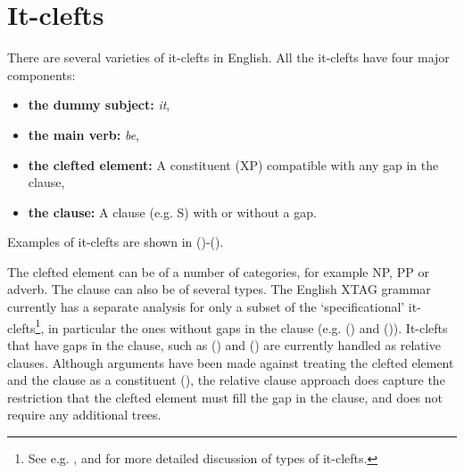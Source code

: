 \chapter{It-clefts}
\label{it-clefts}

There are several varieties of it-clefts in English.  All the
it-clefts have four major components:

\begin{itemize}
\item {\bf the dummy subject:}  {\it it},
\item {\bf the main verb:}  {\it be},
\item {\bf the clefted element:}  A constituent (XP) compatible with
any gap in the clause,
\item {\bf the clause:}  A clause (e.g. S) with or without a gap.
\end{itemize}

\noindent
Examples of it-clefts are shown in ()-().


The clefted element can be of a number of categories, for example NP, PP or
adverb. The clause can also be of several types. The English XTAG grammar
currently has a separate analysis for only a subset of the `specificational'
it-clefts\footnote{See e.g. \cite{Ball91},
\cite{Delin89} and \cite{Delahunty84} for more detailed discussion of
types of it-clefts.}, in particular the ones without gaps in the clause
(e.g. () and ()).  It-clefts that have gaps in the clause, such
as () and () are currently handled as relative clauses. Although
arguments have been made against treating the clefted element and the clause as
a constituent (\cite{Delahunty84}), the relative clause approach does capture
the restriction that the clefted element must fill the gap in the clause, and
does not require any additional trees.


